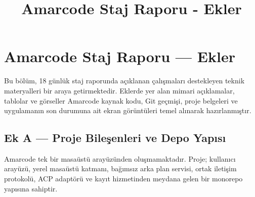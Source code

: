 \documentclass[
  turkish,
  10pt,
  a4paper,
]{article}
\title{Amarcode Staj Raporu - Ekler}
\author{}
\date{}
\begin{document}
\maketitle

\renewcommand*\contentsname{İçindekiler}
{
\hypersetup{linkcolor=}
\setcounter{tocdepth}{3}
\tableofcontents
}
\section{Amarcode Staj Raporu ---
Ekler}\label{amarcode-staj-raporu--ekler}

Bu bölüm, 18 günlük staj raporunda açıklanan çalışmaları destekleyen
teknik materyalleri bir araya getirmektedir. Eklerde yer alan mimari
açıklamalar, tablolar ve görseller Amarcode kaynak kodu, Git geçmişi,
proje belgeleri ve uygulamanın son durumuna ait ekran görüntüleri temel
alınarak hazırlanmıştır.

\subsection{Ek A --- Proje Bileşenleri ve Depo
Yapısı}\label{ek-a--proje-bileux15fenleri-ve-depo-yapux131sux131}

Amarcode tek bir masaüstü arayüzünden oluşmamaktadır. Proje; kullanıcı
arayüzü, yerel masaüstü katmanı, bağımsız arka plan servisi, ortak
iletişim protokolü, ACP adaptörü ve kayıt hizmetinden meydana gelen bir
monorepo yapısına sahiptir.
\end{document}
